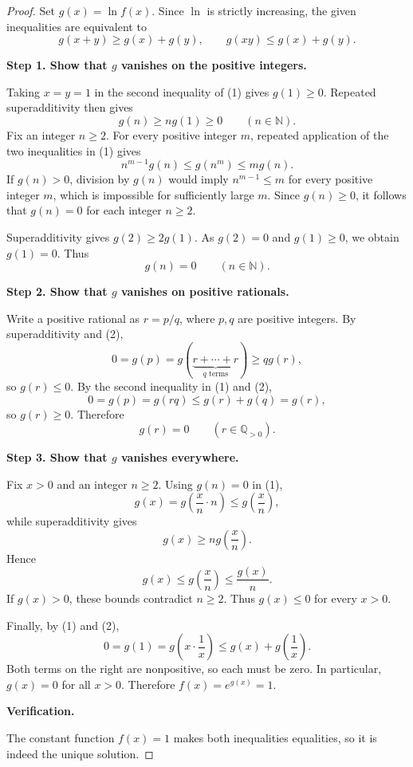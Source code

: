 
\begin{dlsummary}[title={\bfseries Solution 1. The Additive--Multiplicative Rigidity},breakable]

\begin{proof}
Set $g(x)=\ln f(x)$. Since $\ln$ is strictly increasing, the given
inequalities are equivalent to
\[
g(x+y)\geq g(x)+g(y),
\qquad
g(xy)\leq g(x)+g(y). \tag{1}
\]

\medskip
\noindent
\textbf{Step 1. Show that $g$ vanishes on the positive integers.}

Taking $x=y=1$ in the second inequality of (1) gives $g(1)\geq0$.
Repeated superadditivity then gives
\[
g(n)\geq n g(1)\geq0\qquad(n\in\mathbb N).
\]
Fix an integer $n\geq2$. For every positive integer $m$, repeated
application of the two inequalities in (1) gives
\[
n^{m-1}g(n)\leq g(n^m)\leq m g(n).
\]
If $g(n)>0$, division by $g(n)$ would imply
$n^{m-1}\leq m$ for every positive integer $m$, which is impossible
for sufficiently large $m$. Since $g(n)\geq0$, it follows that
$g(n)=0$ for each integer $n\geq2$.

Superadditivity gives $g(2)\geq2g(1)$. As $g(2)=0$ and $g(1)\geq0$,
we obtain $g(1)=0$. Thus
\[
g(n)=0\qquad(n\in\mathbb N). \tag{2}
\]

\medskip
\noindent
\textbf{Step 2. Show that $g$ vanishes on positive rationals.}

Write a positive rational as $r=p/q$, where $p,q$ are positive
integers. By superadditivity and (2),
\[
0=g(p)=g(\underbrace{r+\cdots+r}_{q\text{ terms}})
\geq qg(r),
\]
so $g(r)\leq0$. By the second inequality in (1) and (2),
\[
0=g(p)=g(rq)\leq g(r)+g(q)=g(r),
\]
so $g(r)\geq0$. Therefore
\[
g(r)=0\qquad(r\in\mathbb Q_{>0}). \tag{3}
\]

\medskip
\noindent
\textbf{Step 3. Show that $g$ vanishes everywhere.}

Fix $x>0$ and an integer $n\geq2$. Using $g(n)=0$ in (1),
\[
g(x)=g\!\left(\frac xn\cdot n\right)\leq g\!\left(\frac xn\right),
\]
while superadditivity gives
\[
g(x)\geq n g\!\left(\frac xn\right).
\]
Hence
\[
g(x)\leq g\!\left(\frac xn\right)\leq\frac{g(x)}n.
\]
If $g(x)>0$, these bounds contradict $n\geq2$. Thus $g(x)\leq0$
for every $x>0$.

Finally, by (1) and (2),
\[
0=g(1)=g\!\left(x\cdot\frac1x\right)
\leq g(x)+g\!\left(\frac1x\right).
\]
Both terms on the right are nonpositive, so each must be zero. In
particular, $g(x)=0$ for all $x>0$. Therefore $f(x)=e^{g(x)}=1$.

\medskip
\noindent
\textbf{Verification.}

The constant function $f(x)=1$ makes both inequalities equalities,
so it is indeed the unique solution.
\end{proof}

\end{dlsummary}